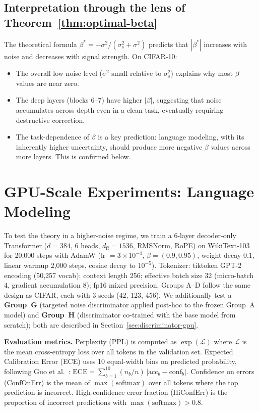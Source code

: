 \documentclass[11pt,a4paper]{article}
\theoremstyle{definition}
\begin{document}
\subsection{Interpretation through the lens of Theorem~\ref{thm:optimal-beta}}

The theoretical formula $\beta^* = -\sigma^2/(\sigma_s^2 + \sigma^2)$
predicts that $|\beta^*|$ increases with noise and decreases with
signal strength. On CIFAR-10:
\begin{itemize}[nosep]
  \item The overall low noise level ($\sigma^2$ small relative to
        $\sigma_s^2$) explains why most $\beta$ values are near zero.
  \item The deep layers (blocks 6--7) have higher $|\beta|$, suggesting
        that noise accumulates across depth even in a clean task,
        eventually requiring destructive correction.
  \item The task-dependence of $\beta$ is a key prediction:
        language modeling, with its inherently higher
        uncertainty, should produce more negative $\beta$ values
        across more layers. This is confirmed below.
\end{itemize}

\section{GPU-Scale Experiments: Language Modeling}
\label{sec:lm}

To test the theory in a higher-noise regime, we train a 6-layer
decoder-only Transformer ($d = 384$, 6 heads, $d_{\mathrm{ff}} = 1536$,
RMSNorm, RoPE) on
WikiText-103 for 20{,}000 steps with AdamW (lr $= 3 \times 10^{-4}$,
$\beta = (0.9, 0.95)$, weight decay 0.1, linear warmup 2{,}000
steps, cosine decay to $10^{-5}$). Tokenizer: tiktoken GPT-2
encoding (50{,}257 vocab); context length 256; effective batch size
32 (micro-batch 4, gradient accumulation 8); fp16 mixed precision.
Groups A--D follow the same design as CIFAR, each with 3 seeds
(42, 123, 456). We additionally test a \textbf{Group~G}
(targeted noise discriminator applied post-hoc to the frozen
Group~A model) and \textbf{Group~H} (discriminator co-trained
with the base model from scratch); both are described in
Section~\ref{sec:discriminator-gpu}.

\textbf{Evaluation metrics.}
Perplexity (PPL) is computed as $\exp(\mathcal{L})$ where
$\mathcal{L}$ is the mean cross-entropy loss over all tokens in the
validation set.
Expected Calibration Error (ECE) uses 10 equal-width bins on
predicted probability, following Guo et al.~\cite{guo2017calibration}:
$\mathrm{ECE} = \sum_{b=1}^{10}(n_b/n)\,|\mathrm{acc}_b -
\mathrm{conf}_b|$.
Confidence on errors (ConfOnErr) is the mean of
$\max(\mathrm{softmax})$ over all tokens where the top prediction
is incorrect.
High-confidence error fraction (HiConfErr) is the proportion of
incorrect predictions with $\max(\mathrm{softmax}) > 0.8$.
\end{document}
